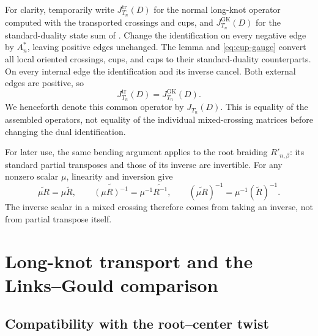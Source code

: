 \documentclass[11pt,a4paper]{article}
\theoremstyle{definition}
\theoremstyle{remark}
\begin{document}
For clarity, temporarily write \(J^{\mathrm{tr}}_{T_n}(D)\) for the
normal long-knot operator computed with the transported crossings and
cups, and \(J^{\mathrm{GK}}_{T_n}(D)\) for the standard-duality
state sum of \cite[Section~2.2]{GK}.  Change the identification on
every negative edge by \(A_n^*\), leaving positive edges unchanged.
The lemma and \eqref{eq:cup-gauge} convert all local oriented crossings,
cups, and caps to their standard-duality counterparts.
On every internal edge the identification and its inverse
cancel.  Both external edges are positive, so
\begin{equation}\label{eq:standard-state-sum-comparison}
 J^{\mathrm{tr}}_{T_n}(D)=J^{\mathrm{GK}}_{T_n}(D).
\end{equation}
We henceforth denote this common operator by \(J_{T_n}(D)\).
This is equality of the assembled operators, not equality of the
individual mixed-crossing matrices before changing the dual
identification.

For later use, the same bending argument applies to the root braiding
\(R'_{n,\beta}\): its standard partial transposes and those of its
inverse are invertible.  For any nonzero scalar \(\mu\), linearity and
inversion give
\[
 \widetilde{\mu R}=\mu\widetilde R,\qquad
 \widetilde{(\mu R)^{-1}}=\mu^{-1}\widetilde{R^{-1}},\qquad
 (\widetilde{\mu R})^{-1}=\mu^{-1}(\widetilde R)^{-1}.
\]
The inverse scalar in a mixed crossing therefore comes from taking
an inverse, not from partial transpose itself.

\section{Long-knot transport and the Links--Gould comparison}
\label{sec:LG}

\subsection{Compatibility with the root--center twist}
\label{sec:oriented-root-center}
\end{document}
